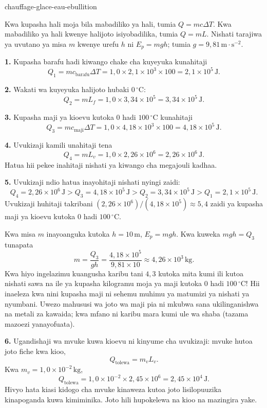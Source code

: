 \begin{exo}{chauffage-glace-eau-ebullition}
\begin{indication}
Kwa kupasha hali moja bila mabadiliko ya hali, tumia $Q=mc\Delta T$. Kwa mabadiliko ya hali kwenye halijoto isiyobadilika, tumia $Q=mL$. Nishati tarajiwa ya uvutano ya misa $m$ kwenye urefu $h$ ni $E_p=mgh$; tumia $g=9{,}81\,\text{m}\!\cdot\!\text{s}^{-2}$.
\end{indication}

\begin{solution}
\textbf{1.} Kupasha barafu hadi kiwango chake cha kuyeyuka kunahitaji
\[
Q_1=mc_{\text{barafu}}\Delta T
=1{,}0\times2{,}1\times10^3\times100
=2{,}1\times10^5\,\text{J}.
\]

\textbf{2.} Wakati wa kuyeyuka halijoto hubaki $0\,{}^\circ\text{C}$:
\[
Q_2=mL_f=1{,}0\times3{,}34\times10^5=3{,}34\times10^5\,\text{J}.
\]

\textbf{3.} Kupasha maji ya kioevu kutoka $0$ hadi $100\,{}^\circ\text{C}$ kunahitaji
\[
Q_3=mc_{\text{maji}}\Delta T
=1{,}0\times4{,}18\times10^3\times100
=4{,}18\times10^5\,\text{J}.
\]

\textbf{4.} Uvukizaji kamili unahitaji tena
\[
Q_4=mL_v=1{,}0\times2{,}26\times10^6=2{,}26\times10^6\,\text{J}.
\]
Hatua hii pekee inahitaji nishati ya kiwango cha megajouli kadhaa.

\textbf{5.} Uvukizaji ndio hatua inayohitaji nishati nyingi zaidi:
\[
Q_4=2{,}26\times10^6\,\text{J}
>Q_3=4{,}18\times10^5\,\text{J}
>Q_2=3{,}34\times10^5\,\text{J}
>Q_1=2{,}1\times10^5\,\text{J}.
\]
Uvukizaji huhitaji takribani $(2{,}26\times10^6)/(4{,}18\times10^5)\approx5{,}4$ zaidi ya kupasha maji ya kioevu kutoka $0$ hadi $100\,{}^\circ\text{C}$.

Kwa misa $m$ inayoanguka kutoka $h=10\,\text{m}$, $E_p=mgh$. Kwa kuweka $mgh=Q_3$ tunapata
\[
m=\frac{Q_3}{gh}
=\frac{4{,}18\times10^5}{9{,}81\times10}
\approx4{,}26\times10^3\,\text{kg}.
\]
Kwa hiyo ingelazimu kuangusha karibu tani $4{,}3$ kutoka mita kumi ili kutoa nishati sawa na ile ya kupasha kilogramu moja ya maji kutoka $0$ hadi $100\,{}^\circ\text{C}$! Hii inaeleza kwa nini kupasha maji ni sehemu muhimu ya matumizi ya nishati ya nyumbani. Uwezo mahususi wa joto wa maji pia ni mkubwa sana ukilinganishwa na metali za kawaida; kwa mfano ni karibu mara kumi ule wa shaba (tazama mazoezi yanayofuata).

\textbf{6.} Ugandishaji wa mvuke kuwa kioevu ni kinyume cha uvukizaji: mvuke hutoa joto fiche kwa kioo,
\[
Q_{\text{tolewa}}=m_vL_v.
\]
Kwa $m_v=1{,}0\times10^{-2}\,\text{kg}$,
\[
Q_{\text{tolewa}}=1{,}0\times10^{-2}\times2{,}45\times10^6
=2{,}45\times10^4\,\text{J}.
\]
Hivyo hata kiasi kidogo cha mvuke kinaweza kutoa joto lisilopuuzika kinapoganda kuwa kimiminika. Joto hili hupokelewa na kioo na mazingira yake.
\end{solution}
\end{exo}

